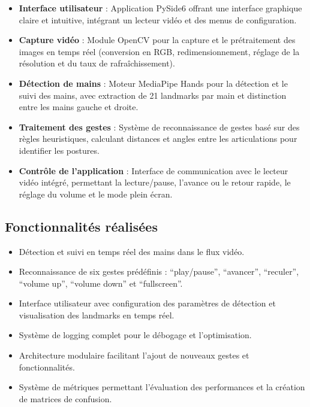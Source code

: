 \documentclass[12pt,a4paper]{article}
\begin{document}
\begin{itemize}
    \item \textbf{Interface utilisateur} : Application PySide6 offrant une interface graphique claire et intuitive, intégrant un lecteur vidéo et des menus de configuration.
    
    \item \textbf{Capture vidéo} : Module OpenCV pour la capture et le prétraitement des images en temps réel (conversion en RGB, redimensionnement, réglage de la résolution et du taux de rafraîchissement).
    
    \item \textbf{Détection de mains} : Moteur MediaPipe Hands pour la détection et le suivi des mains, avec extraction de 21 landmarks par main et distinction entre les mains gauche et droite.
    
    \item \textbf{Traitement des gestes} : Système de reconnaissance de gestes basé sur des règles heuristiques, calculant distances et angles entre les articulations pour identifier les postures.
    
    \item \textbf{Contrôle de l'application} : Interface de communication avec le lecteur vidéo intégré, permettant la lecture/pause, l'avance ou le retour rapide, le réglage du volume et le mode plein écran.
\end{itemize}

\subsection{Fonctionnalités réalisées}

\begin{itemize}
    \item Détection et suivi en temps réel des mains dans le flux vidéo.
    \item Reconnaissance de six gestes prédéfinis : ``play/pause'', ``avancer'', ``reculer'', ``volume up'', ``volume down'' et ``fullscreen''.
    \item Interface utilisateur avec configuration des paramètres de détection et visualisation des landmarks en temps réel.
    \item Système de logging complet pour le débogage et l'optimisation.
    \item Architecture modulaire facilitant l'ajout de nouveaux gestes et fonctionnalités.
    \item Système de métriques permettant l'évaluation des performances et la création de matrices de confusion.
\end{itemize}
\end{document}
